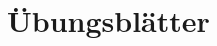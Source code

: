 \section{Übungsblätter}
\blatt

\blatt

\blatt

\blatt

\blatt

\blatt

\blatt

\blatt

\blatt

\blatt

\blatt

